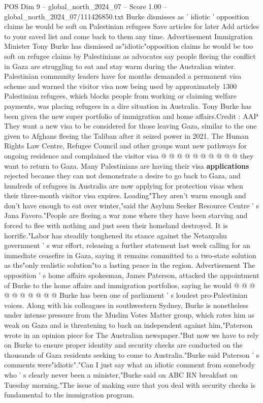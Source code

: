 \begin{textsample}{POS Dim 9 – global\_north\_2024\_07 – Score 1.00 – global\_north\_2024\_07/111426850.txt}  \label{ex:f9_pos_292}
Burke dismisses as ' idiotic ' opposition claims he would be soft on Palestinian refugees Save articles for later Add articles to your saved list and come back to them any time.
Advertisement Immigration Minister Tony Burke has dismissed as"idiotic"opposition claims he would be too soft on refugee claims by Palestinians as advocates say people fleeing the conflict in Gaza are struggling to eat and stay warm during the Australian winter.
Palestinian community leaders have for months demanded a permanent visa scheme and warned the visitor visa now being used by approximately 1300 Palestinian refugees, which blocks people from working or claiming welfare payments, was placing refugees in a dire situation in Australia.
Tony Burke has been given the new super portfolio of immigration and home affairs.Credit : AAP They want a new visa to be considered for those leaving Gaza, similar to the one given to Afghans fleeing the Taliban after it seized power in 2021.
The Human Rights Law Centre, Refugee Council and other groups want new pathways for ongoing residence and complained the visitor visa @ @ @ @ @ @ @ @ @ @ they want to return to Gaza.
Many Palestinians are having their visa \textbf{applications} rejected because they can not demonstrate a desire to go back to Gaza, and hundreds of refugees in Australia are now applying for protection visas when their three-month visitor visa expires.
Loading"They aren't warm enough and don't have enough to eat over winter,"said the Asylum Seeker Resource Centre ' s Jana Favero."People are fleeing a war zone where they have been starving and forced to flee with nothing and just seen their homeland destroyed.
It is horrific."Labor has steadily toughened its stance against the Netanyahu government ' s war effort, releasing a further statement last week calling for an immediate ceasefire in Gaza, saying it remains committed to a two-state solution as the"only realistic solution"to a lasting peace in the region.
Advertisement The opposition ' s home affairs spokesman, James Paterson, attacked the appointment of Burke to the home affairs and immigration portfolios, saying he would @ @ @ @ @ @ @ @ @ @ Burke has been one of parliament ' s loudest pro-Palestinian voices.
Along with his colleagues in southwestern Sydney, Burke is nonetheless under intense pressure from the Muslim Votes Matter group, which rates him as weak on Gaza and is threatening to back an independent against him,"Paterson wrote in an opinion piece for The Australian newspaper."But now we have to rely on Burke to ensure proper identity and security checks are conducted on the thousands of Gaza residents seeking to come to Australia."Burke said Paterson ' s comments were"idiotic"."Can I just say what an idiotic comment from somebody who ' s clearly never been a minister,"Burke said on ABC RN breakfast on Tuesday morning."The issue of making sure that you deal with security checks is fundamental to the immigration program.

\end{textsample}

